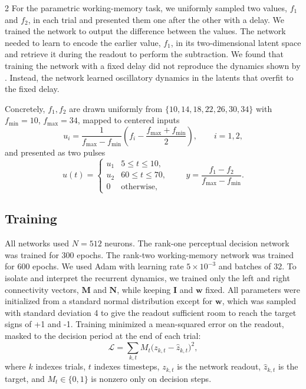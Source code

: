 \documentclass[10pt]{article}
\begin{document}
\begin{multicols}{2}
For the parametric working-memory task, we uniformly sampled two values, $f_1$ and $f_2$, in each trial and presented them one after the other with a delay. We trained the network to output the difference between the values. The network needed to learn to encode the earlier value, $f_1$, in its two-dimensional latent space and retrieve it during the readout to perform the subtraction. We found that training the network with a fixed delay did not reproduce the dynamics shown by \citet{dubreuil2022}. Instead, the network learned oscillatory dynamics in the latents that overfit to the fixed delay.

Concretely, $f_1,f_2$ are drawn uniformly from $\{10,\allowbreak 14,\allowbreak 18,\allowbreak 22,\allowbreak 26,\allowbreak 30,\allowbreak 34\}$ with $f_{\min}=10$, $f_{\max}=34$, mapped to centered inputs
\begin{equation}
u_i=\frac{1}{f_{\max}-f_{\min}}
\left(f_i-\frac{f_{\max}+f_{\min}}{2}\right),
\qquad i=1,2,
\end{equation}
and presented as two pulses
\begin{equation}
u(t)=\begin{cases}
u_1 & 5\le t\le 10,\\
u_2 & 60\le t\le 70,\\
0 & \text{otherwise,}
\end{cases}
\qquad
y=\frac{f_1-f_2}{f_{\max}-f_{\min}}.
\end{equation}

\subsection{Training}

All networks used $N=512$ neurons. The rank-one perceptual decision network was trained for 300 epochs. The rank-two working-memory network was trained for 600 epochs. We used Adam with learning rate $5\times10^{-3}$ and batches of 32. To isolate and interpret the recurrent dynamics, we trained only the left and right connectivity vectors, $\mathbf{M}$ and $\mathbf{N}$, while keeping $\mathbf{I}$ and $\mathbf{w}$ fixed. All parameters were initialized from a standard normal distribution except for $\mathbf{w}$, which was sampled with standard deviation 4 to give the readout sufficient room to reach the target signs of +1 and -1. Training minimized a mean-squared error on the readout, masked to the decision period at the end of each trial:
\begin{equation}
\mathcal{L}
=\sum_{k,t}M_t\bigl(z_{k,t}-\hat{z}_{k,t}\bigr)^{2},
\end{equation}
where $k$ indexes trials, $t$ indexes timesteps, $z_{k,t}$ is the network readout, $\hat{z}_{k,t}$ is the target, and $M_t\in\{0,1\}$ is nonzero only on decision steps.

\end{multicols}
\end{document}
